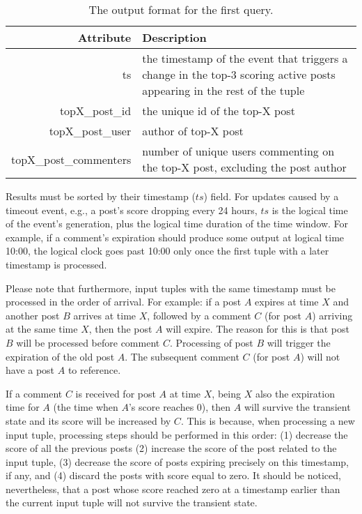 \documentclass{sig-alternate}
\begin{document}
\begin{table}[ht]
	\caption{The output format for the first query.}
	\centering 
	\begin{tabular}{r p{4.4cm}}
		\toprule
		Attribute		&	 Description\\
		\midrule
		ts			&	the timestamp of the event that triggers a change in the top-3 scoring active posts appearing in the rest of the tuple\\[2ex]
		topX\_post\_id	&	the unique id of the top-X post\\[2ex]		
		topX\_post\_user	& 	 author of top-X post\\[2ex]		
		topX\_post\_commenters & number of unique users commenting on the top-X post, excluding the post author\\[2ex]
		\bottomrule 
	\end{tabular}
	\label{table:query1}
\end{table}

Results must be sorted by their timestamp ($ts$) field. For updates caused by a timeout event, e.g., a post's score dropping every 24 hours, $ts$ is the logical time of the event's generation, plus the logical time duration of the time window. For example, if a comment's expiration should produce some output at logical time 10:00, the logical clock goes past 10:00 only once the first tuple with a later timestamp is processed.

Please note that furthermore, input tuples with the same timestamp must be processed in the order of arrival. For example: if a post $A$ expires at time $X$ and another post $B$ arrives at time $X$, followed by a comment $C$ (for post $A$) arriving at the same time $X$, then the post $A$ will expire. The reason for this is that post $B$ will be processed before comment $C$. Processing of post $B$ will trigger the expiration of the old post $A$. The subsequent comment $C$ (for post $A$) will not have a post $A$ to reference.

If a comment $C$ is received for post $A$ at time $X$, being $X$ also the expiration time for $A$ (the time when $A$'s score reaches 0), then $A$ will survive the transient state and its score will be increased by $C$. This is because, when processing a new input tuple, processing steps should be performed in this order: (1) decrease the score of all the previous posts (2) increase the score of the post related to the input tuple, (3) decrease the score of posts expiring precisely on this timestamp, if any, and (4) discard the posts with score equal to zero. It should be noticed, nevertheless, that a post whose score reached zero at a timestamp earlier than the current input tuple will not survive the transient state.
\end{document}
